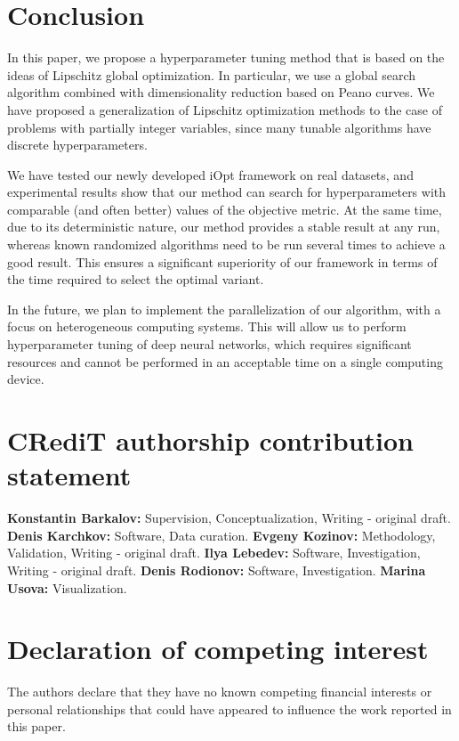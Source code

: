\documentclass[preprint,12pt]{elsarticle}
\begin{document}
\section{Conclusion}
In this paper, we propose a hyperparameter tuning method that is based on the ideas of Lipschitz global optimization. In particular, we use a global search algorithm combined with dimensionality reduction based on Peano curves. We have proposed a generalization of Lipschitz optimization methods to the case of problems with partially integer variables, since many tunable algorithms have discrete hyperparameters.

We have tested our newly developed iOpt framework on real datasets, and experimental results show that our method can search for hyperparameters with comparable (and often better) values of the objective metric. At the same time, due to its deterministic nature, our method provides a stable result at any run, whereas known randomized algorithms need to be run several times to achieve a good result. This ensures a significant superiority of our framework in terms of the time required to select the optimal variant.

In the future, we plan to implement the parallelization of our algorithm, with a focus on heterogeneous computing systems. This will allow us to perform hyperparameter tuning of deep neural networks, which requires significant resources and cannot be performed in an acceptable time on a single computing device.


\section*{CRediT authorship contribution statement}

\textbf{Konstantin Barkalov:} Supervision, Conceptualization, Writing - original draft.
\textbf{Denis Karchkov:} Software, Data curation.
\textbf{Evgeny Kozinov:} Methodology, Validation, Writing - original draft.
\textbf{Ilya Lebedev:} Software, Investigation, Writing - original draft.
\textbf{Denis Rodionov:} Software, Investigation.
\textbf{Marina Usova:} Visualization.


\section*{Declaration of competing interest}

The authors declare that they have no known competing financial interests or personal relationships that could have appeared to influence the work reported in this paper.
\end{document}
